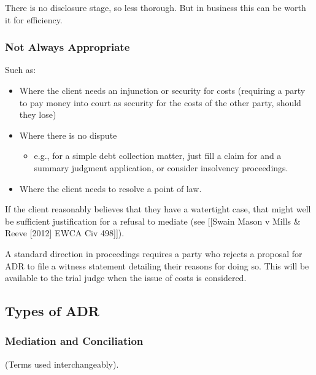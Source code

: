 \documentclass[
]{article}
\providecommand{\tightlist}{%
  \setlength{\itemsep}{0pt}\setlength{\parskip}{0pt}}
\begin{document}
There is no disclosure stage, so less thorough. But in business this can
be worth it for efficiency.

\hypertarget{not-always-appropriate}{%
\subsubsection{Not Always Appropriate}\label{not-always-appropriate}}

Such as:

\begin{itemize}
\tightlist
\item
  Where the client needs an injunction or security for costs (requiring
  a party to pay money into court as security for the costs of the other
  party, should they lose)
\item
  Where there is no dispute

  \begin{itemize}
  \tightlist
  \item
    e.g., for a simple debt collection matter, just fill a claim for and
    a summary judgment application, or consider insolvency proceedings.
  \end{itemize}
\item
  Where the client needs to resolve a point of law.
\end{itemize}

If the client reasonably believes that they have a watertight case, that
might well be sufficient justification for a refusal to mediate (see
{[}{[}Swain Mason v Mills \& Reeve {[}2012{]} EWCA Civ 498{]}{]}).

A standard direction in proceedings requires a party who rejects a
proposal for ADR to file a witness statement detailing their reasons for
doing so. This will be available to the trial judge when the issue of
costs is considered.

\hypertarget{types-of-adr}{%
\subsection{Types of ADR}\label{types-of-adr}}

\hypertarget{mediation-and-conciliation}{%
\subsubsection{Mediation and
Conciliation}\label{mediation-and-conciliation}}

(Terms used interchangeably).
\end{document}
